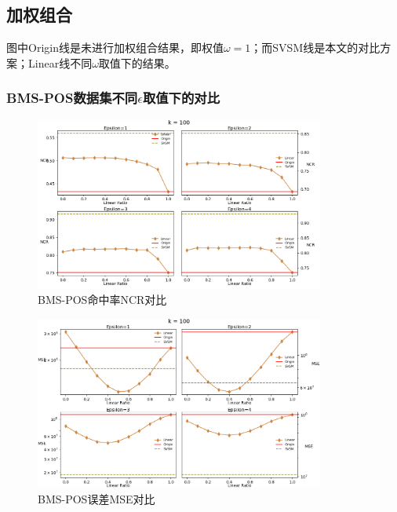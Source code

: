 \documentclass[UTF8,a4paper]{ctexart}
\begin{document}
\subsection{加权组合}
图中Origin线是未进行加权组合结果，即权值$\omega=1$；而SVSM线是本文的对比方案；Linear线不同$\omega$取值下的结果。
\subsubsection{BMS-POS数据集不同$\epsilon$取值下的对比}

  \begin{figure}[htbp]
    \centering
    \includegraphics[width=0.85\textwidth]{pos_linear_ncr}
    \caption{BMS-POS命中率NCR对比}
    \label{fig:pos_linear_ncr}
  \end{figure}

  \begin{figure}[htbp]
    \centering
    \includegraphics[width=0.85\textwidth]{pos_linear_mse}
    \caption{BMS-POS误差MSE对比}
    \label{fig:pos_linear_mse}
  \end{figure}

\end{document}
